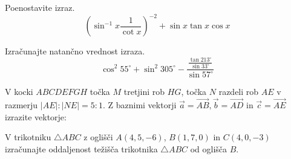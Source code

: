 \documentclass[addpoints]{exam}
\begin{document}
\begin{questions}


    \question[4]
    Poenostavite izraz. 
    $$ \left(\sin^{-1}x\dfrac{1}{\cot x}\right)^{-2}+\sin x\tan x\cos x $$

    \begin{solution}[6.5cm]
       
    \end{solution}



    \question[4]
    Izračunajte natančno vrednost izraza. 
    $$ \cos^2 55^\circ + \sin^2 305^\circ - \dfrac{\frac{\tan 213^\circ}{\sin 33^\circ}}{\sin 57^\circ} $$

    \begin{solution}[6cm]
       
    \end{solution}


\newpage

    \question
    V kocki $ABCDEFGH$ točka $M$ tretjini rob $HG$, točka $N$ razdeli rob $AE$ v razmerju $|AE|:|NE|=5:1$.
    Z baznimi vektorji $\overrightarrow{a}=\overrightarrow{AB}, \overrightarrow{b}=\overrightarrow{AD}$ in $\overrightarrow{c}=\overrightarrow{AE}$ izrazite vektorje: 

    \begin{solution}[5cm]

    \end{solution}

    

    

    \question[4]
    V trikotniku $\triangle ABC$ z oglišči $A(4,5,-6)$, $B(1,7,0)$ in $C(4,0,-3)$ izračunajte oddaljenost težišča trikotnika $\triangle ABC$ od oglišča $B$.


\end{questions}
\end{document}
